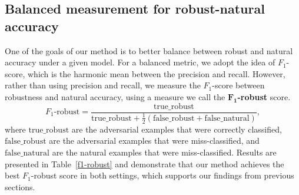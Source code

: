


\subsection{Balanced measurement for robust-natural accuracy}
One of the goals of our method is to better balance between robust and natural accuracy under a given model. For a balanced metric, we adopt the idea of $F_1$-score, which is the harmonic mean between the precision and recall. However, rather than using precision and recall, we measure the $F_1$-score between robustness and natural accuracy,
using a measure we call
the
\textbf{$\mathbf{F_1}$-robust} score.
\begin{equation}
F_1\text{-robust} = \dfrac{\text{true\_robust}}
{\text{true\_robust}+\frac{1}{2}
(\text{false\_{robust}}+
\text{false\_natural})},
\end{equation}
where $\text{true\_robust}$ are the adversarial examples that were correctly classified, $\text{false\_{robust}}$ are the adversarial examples that were miss-classified, and $\text{false\_natural}$ are the natural examples that were miss-classified.
Results are presented in Table~\ref{f1-robust} and demonstrate that our method achieves the best $F_1$-robust score in both settings, which supports our findings from previous sections.

